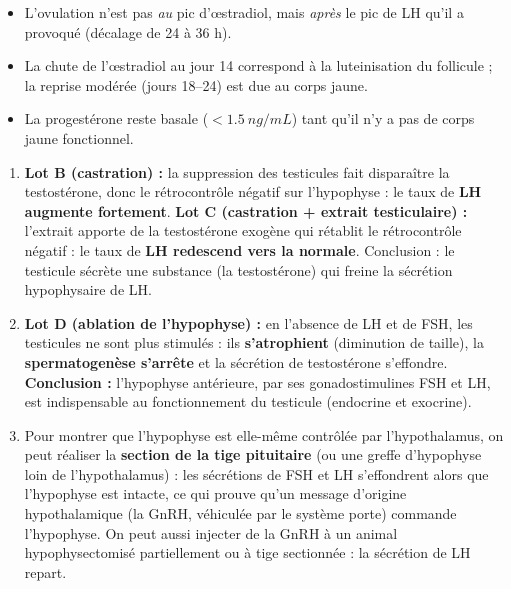 \documentclass[11pt]{article}
\begin{document}
\begin{attention}
\begin{itemize}
\item L'ovulation n'est pas \emph{au} pic d'œstradiol, mais \emph{après} le pic de LH qu'il a provoqué (décalage de 24 à 36 h).
\item La chute de l'œstradiol au jour 14 correspond à la luteinisation du follicule ; la reprise modérée (jours 18--24) est due au corps jaune.
\item La progestérone reste basale ($< \SI{1,5}{ng/mL}$) tant qu'il n'y a pas de corps jaune fonctionnel.
\end{itemize}
\end{attention}

\begin{corrige}
\begin{enumerate}
\item \textbf{Lot B (castration) :} la suppression des testicules fait disparaître la testostérone, donc le rétrocontrôle négatif sur l'hypophyse : le taux de \textbf{LH augmente fortement}. \textbf{Lot C (castration + extrait testiculaire) :} l'extrait apporte de la testostérone exogène qui rétablit le rétrocontrôle négatif : le taux de \textbf{LH redescend vers la normale}. Conclusion : le testicule sécrète une substance (la testostérone) qui freine la sécrétion hypophysaire de LH.
\item \textbf{Lot D (ablation de l'hypophyse) :} en l'absence de LH et de FSH, les testicules ne sont plus stimulés : ils \textbf{s'atrophient} (diminution de taille), la \textbf{spermatogenèse s'arrête} et la sécrétion de testostérone s'effondre. \textbf{Conclusion :} l'hypophyse antérieure, par ses gonadostimulines FSH et LH, est indispensable au fonctionnement du testicule (endocrine et exocrine).
\item Pour montrer que l'hypophyse est elle-même contrôlée par l'hypothalamus, on peut réaliser la \textbf{section de la tige pituitaire} (ou une greffe d'hypophyse loin de l'hypothalamus) : les sécrétions de FSH et LH s'effondrent alors que l'hypophyse est intacte, ce qui prouve qu'un message d'origine hypothalamique (la GnRH, véhiculée par le système porte) commande l'hypophyse. On peut aussi injecter de la GnRH à un animal hypophysectomisé partiellement ou à tige sectionnée : la sécrétion de LH repart.
\end{enumerate}
\end{corrige}
\end{document}
